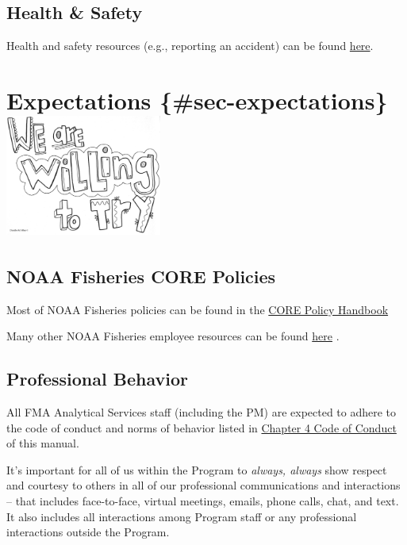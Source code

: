 \documentclass[
  letterpaper,
  DIV=11,
  numbers=noendperiod]{scrreprt}
\begin{document}
\section{Health \& Safety}\label{health-safety}

Health and safety resources (e.g., reporting an accident) can be found
\href{https://sites.google.com/noaa.gov/myafsc/safety}{here}.


\chapter[Expectations
\{\#sec-expectations\}]{\texorpdfstring{Expectations
\{\#sec-expectations\}\protect\includegraphics[width=\textwidth,height=1.5625in]{_img/wearewilling.png}}{Expectations \{\#sec-expectations\}}}\label{expectations-sec-expectations}

\section{NOAA Fisheries CORE
Policies}\label{noaa-fisheries-core-policies}

Most of NOAA Fisheries policies can be found in the
\href{https://sites.google.com/noaa.gov/inside-fisheries-core/table-of-contents}{CORE
Policy Handbook}

Many other NOAA Fisheries employee resources can be found
\href{https://sites.google.com/noaa.gov/inside-fisheries/home}{here} .

\section{Professional Behavior}\label{professional-behavior}

All FMA Analytical Services staff (including the PM) are expected to
adhere to the code of conduct and norms of behavior listed in
\hyperref[sec-code-of-conduct]{Chapter 4 Code of Conduct} of this
manual.

It's important for all of us within the Program to \emph{always, always}
show respect and courtesy to others in all of our professional
communications and interactions -- that includes face-to-face, virtual
meetings, emails, phone calls, chat, and text. It also includes all
interactions among Program staff or any professional interactions
outside the Program.
\end{document}
